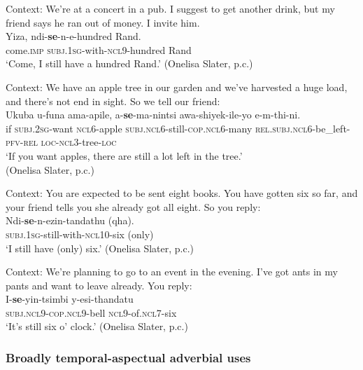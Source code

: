 \begin{exe}

	\ex\label{exAppendixXhosaScalar1}
	Context: We’re at a concert in a pub. I suggest to get another drink, but my friend says he ran out of money. I invite him.\\
	\gll Yiza, ndi-\textbf{se}-n-e-hundred Rand.\\
	come.\textsc{imp} \textsc{subj}.1\textsc{sg}-with-\textsc{ncl}9-hundred Rand\\
	\glt \lq Come, I still have a hundred Rand.' (Onelisa Slater, p.c.)
	
	\ex\label{exAppendixXhosaScalar2}
	Context: We have an apple tree in our garden and we’ve harvested a huge load, and there’s not end in sight. So we tell our friend:\\
	\gll Ukuba u-funa ama-apile, a-\textbf{se}-ma-nintsi awa-shiyek-ile-yo e-m-thi-ni.\\
	if \textsc{subj}.2\textsc{sg}-want \textsc{ncl}6-apple \textsc{subj}.\textsc{ncl}6-still-\textsc{cop}.\textsc{ncl}6-many \textsc{rel}.\textsc{subj.\textsc{ncl}6}-be\_left-\textsc{pfv}-\textsc{rel} \textsc{loc}-\textsc{ncl}3-tree-\textsc{loc}\\
	\glt \lq If you want apples, there are still a lot left in the tree.'
	\\(Onelisa Slater, p.c.)
	
	\ex\label{exAppendixXhosaScalar3}
	Context: You are expected to be sent eight books. You have gotten six so far, and your friend tells you she already got all eight. So you reply:\\
	\gll Ndi-\textbf{se}-n-ezin-tandathu (qha).\\
	\textsc{subj}.1\textsc{sg}-still-with-\textsc{ncl}10-six (only)\\
	\glt \lq I still have (only) six.' (Onelisa Slater, p.c.)
	
	\ex\label{exAppendixXhosaScalar4}
	Context: We’re planning to go to an event in the evening. I’ve got ants in my pants and want to leave already. You reply:\\
	\gll I-\textbf{se}-yin-tsimbi y-esi-thandatu\\
	\textsc{subj}.\textsc{ncl}9-\textsc{cop}.\textsc{ncl}9-bell \textsc{ncl}9-of.\textsc{ncl}7-six\\
	\glt \lq It's still six o' clock.' (Onelisa Slater, p.c.)
\end{exe}


\subsubsection{Broadly temporal-aspectual adverbial uses}
